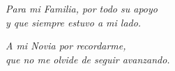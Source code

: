 \chapter*{}


\begin{flushright}
  \textit{Para mi Familia, por todo su apoyo} \\
  \textit{y que siempre estuvo a mi lado.}\\

\hfill \break

  \textit{A mi Novia por recordarme,}\\
  \textit{que no me olvide de seguir avanzando.}\\
\end{flushright}
